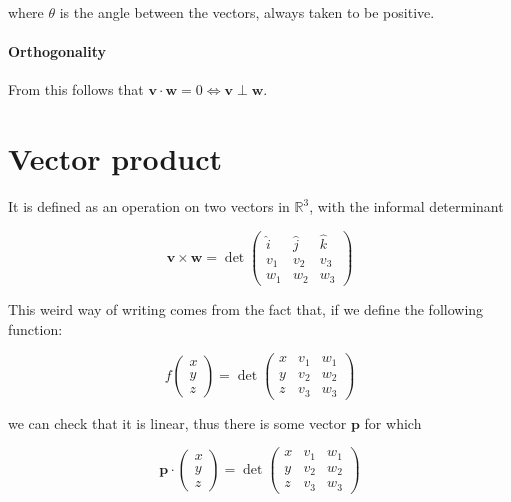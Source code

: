 \documentclass[12pt,a4paper]{report}
\numberwithin{equation}{section}
\theoremstyle{definition}
\theoremstyle{remark}
\begin{document}
where $\theta$ is the angle between the vectors, always taken to be positive.

\paragraph{Orthogonality}

From this follows that $\mathbf{v} \cdot \mathbf{w} = 0 \iff \mathbf{v}\perp \mathbf{w}$.

\section{Vector product}

It is defined as an operation on two vectors in $\mathbb{R}^3$, with the informal determinant

\begin{equation}
\mathbf{v} \times \mathbf{w} =\det \begin{pmatrix}
\hat{i} & \hat{j} & \hat{k}\\
v_1 & v_2 & v_3 \\
w_1 & w_2 & w_3 
\end{pmatrix}
\end{equation}

This weird way of writing comes from the fact that, if we define the following function:

\begin{equation}
f\begin{pmatrix}
x\\y\\z
\end{pmatrix}
=\det \begin{pmatrix}
x & v_1 & w_1\\
y & v_2 & w_2 \\
z & v_3 & w_3
\end{pmatrix}
\end{equation}

we can check that it is linear, thus there is some vector $\mathbf{p}$ for which

\begin{equation}
\mathbf{p} \cdot \begin{pmatrix}
x\\y\\z
\end{pmatrix}=
\det \begin{pmatrix}
x & v_1 & w_1\\
y & v_2 & w_2 \\
z & v_3 & w_3
\end{pmatrix}
\end{equation}
\end{document}
